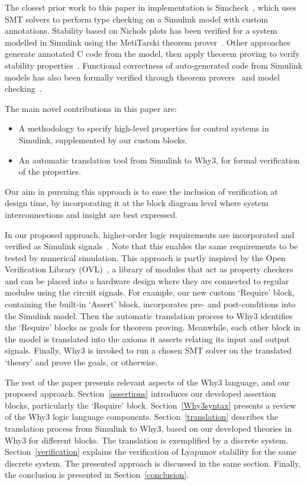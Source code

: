 \documentclass[a4paper]{article}
\begin{document}
The closest prior work to this paper in implementation is Simcheck~\cite{Simcheck}, which uses SMT solvers to perform type checking on a Simulink model with custom annotations. Stability based on Nichols plots has been verified for a system modelled in Simulink using the MetiTarski theorem prover~\cite{Metitarski}. Other approaches generate annotated C code from the model, then apply theorem proving to verify stability properties~\cite{Jobredeaux,Herencia}. Functional correctness of auto-generated code from Simulink models has also been formally verified through theorem provers~\cite{Clawz,Circus,Sparkfromsimulink,implementations} and model checking~\cite{Staats}.   

The main novel contributions in this paper are:
\begin{itemize}
\item A methodology to specify high-level properties for control systems in Simulink, supplemented by our custom blocks.
\item An automatic translation tool from Simulink to Why3, for formal verification of the properties. 
\end{itemize}
Our aim in pursuing this approach is to ease the inclusion of verification at design time, by incorporating it at the block diagram level where system interconnections and insight are best expressed.

In our proposed approach, higher-order logic requirements are incorporated and verified as Simulink signals~\cite{Hardware}. Note that this enables the same requirements to be tested by numerical simulation. This approach is partly inspired by the Open Verification Library (OVL)~\cite{OVL}, a library of modules that act as property checkers and can be placed into a hardware design where they are connected to regular modules using the circuit signals. For example, our new custom `Require' block, containing the built-in `Assert' block, incorporates pre- and post-conditions into the Simulink model. Then the automatic translation process to Why3 identifies the `Require' blocks as goals for theorem proving.  Meanwhile, each other block in the model is translated into the axioms it asserts relating its input and output signals. Finally, Why3 is invoked to run a chosen SMT solver on the translated `theory' and prove the goals, or otherwise.   

The rest of the paper presents relevant aspects of the Why3 language, and our proposed approach. Section~\ref{assertions} introduces our developed assertion blocks, particularly the `Require' block. Section~\ref{Why3syntax} presents a review of the Why3 logic language components. Section~\ref{translation} describes the translation process from Simulink to Why3, based on our developed theories in Why3 for different blocks. The translation is exemplified by a discrete system. Section~\ref{verification} explains the verification of Lyapunov stability for the same discrete system. The presented approach is discussed in the same section. Finally, the conclusion is presented in Section~\ref{conclusion}. 
\end{document}

